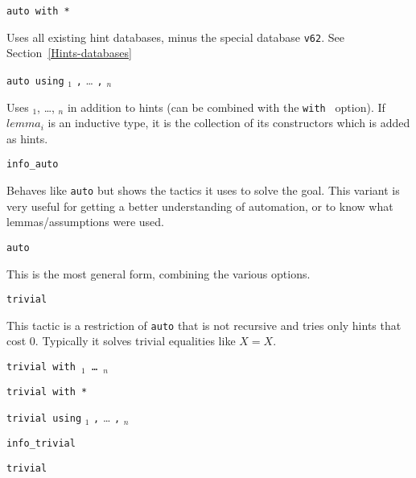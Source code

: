 \begin{coq_example*}
\begin{Variants}
\item {\tt auto with *}

  Uses all existing hint databases, minus the special database
  {\tt v62}. See Section~\ref{Hints-databases}

\item \texttt{auto using} $_1$ {\tt ,} {\ldots} {\tt ,} $_n$

  Uses $_1$, \ldots, $_n$ in addition to
  hints (can be combined with the \texttt{with \ident} option). If
  $lemma_i$ is an inductive type, it is the collection of its
  constructors which is added as hints.

\item {\tt info\_auto}

  Behaves like {\tt auto} but shows the tactics it uses to solve the goal.
  This variant is very useful for getting a better understanding of automation,
  or to know what lemmas/assumptions were used.

\item {\tt {}auto \zeroone{\num}}  

  This is the most general form, combining the various options.

\item {\tt trivial}

  This tactic is a restriction of {\tt auto} that is not recursive and
  tries only hints that cost 0. Typically it solves trivial
  equalities like $X=X$.

\item \texttt{trivial with \ident$_1$ \dots\ \ident$_n$}

\item \texttt{trivial with *}

\item \texttt{trivial using} $_1$ {\tt ,} {\ldots} {\tt ,} $_n$

\item {\tt info\_trivial}

\item {\tt {}trivial}  

\end{Variants}


\end{coq_example*}
